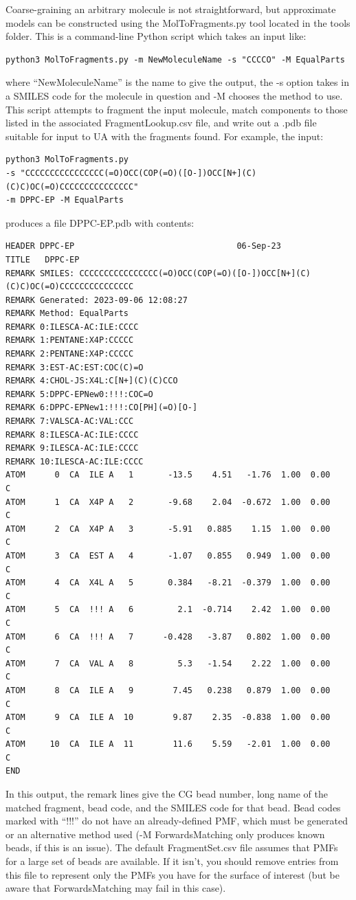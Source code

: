 \documentclass[10pt,a4paper,onecolumn]{report}
\begin{document}
Coarse-graining an arbitrary molecule is not straightforward, but approximate models can be constructed using the MolToFragments.py tool located in the tools folder. This is a command-line Python script which takes an input like:
\begin{lstlisting}
python3 MolToFragments.py -m NewMoleculeName -s "CCCCO" -M EqualParts
\end{lstlisting}
where ``NewMoleculeName'' is the name to give the output, the -s option takes in a SMILES code for the molecule in question and -M chooses the method to use. This script attempts to fragment the input molecule, match components to those listed in the associated FragmentLookup.csv file, and write out a .pdb file suitable for input to UA with the fragments found. For example, the input:
\begin{lstlisting}
python3 MolToFragments.py 
-s "CCCCCCCCCCCCCCCC(=O)OCC(COP(=O)([O-])OCC[N+](C)(C)C)OC(=O)CCCCCCCCCCCCCCC" 
-m DPPC-EP -M EqualParts
\end{lstlisting}
produces a file DPPC-EP.pdb with contents:
\begin{lstlisting}
HEADER DPPC-EP                                 06-Sep-23
TITLE   DPPC-EP
REMARK SMILES: CCCCCCCCCCCCCCCC(=O)OCC(COP(=O)([O-])OCC[N+](C)(C)C)OC(=O)CCCCCCCCCCCCCCC
REMARK Generated: 2023-09-06 12:08:27
REMARK Method: EqualParts
REMARK 0:ILESCA-AC:ILE:CCCC
REMARK 1:PENTANE:X4P:CCCCC
REMARK 2:PENTANE:X4P:CCCCC
REMARK 3:EST-AC:EST:COC(C)=O
REMARK 4:CHOL-JS:X4L:C[N+](C)(C)CCO
REMARK 5:DPPC-EPNew0:!!!:COC=O
REMARK 6:DPPC-EPNew1:!!!:CO[PH](=O)[O-]
REMARK 7:VALSCA-AC:VAL:CCC
REMARK 8:ILESCA-AC:ILE:CCCC
REMARK 9:ILESCA-AC:ILE:CCCC
REMARK 10:ILESCA-AC:ILE:CCCC
ATOM      0  CA  ILE A   1       -13.5    4.51   -1.76  1.00  0.00           C
ATOM      1  CA  X4P A   2       -9.68    2.04  -0.672  1.00  0.00           C
ATOM      2  CA  X4P A   3       -5.91   0.885    1.15  1.00  0.00           C
ATOM      3  CA  EST A   4       -1.07   0.855   0.949  1.00  0.00           C
ATOM      4  CA  X4L A   5       0.384   -8.21  -0.379  1.00  0.00           C
ATOM      5  CA  !!! A   6         2.1  -0.714    2.42  1.00  0.00           C
ATOM      6  CA  !!! A   7      -0.428   -3.87   0.802  1.00  0.00           C
ATOM      7  CA  VAL A   8         5.3   -1.54    2.22  1.00  0.00           C
ATOM      8  CA  ILE A   9        7.45   0.238   0.879  1.00  0.00           C
ATOM      9  CA  ILE A  10        9.87    2.35  -0.838  1.00  0.00           C
ATOM     10  CA  ILE A  11        11.6    5.59   -2.01  1.00  0.00           C
END
\end{lstlisting}
In this output, the remark lines give the CG bead number, long name of the matched fragment, bead code, and the SMILES code for that bead. Bead codes marked with ``!!!'' do not have an already-defined PMF, which must be generated or an alternative method used (-M ForwardsMatching only produces known beads, if this is an issue). The default FragmentSet.csv file assumes that PMFs for a large set of beads are available. If it isn't, you should remove entries from this file to represent only the PMFs you have for the surface of interest (but be aware that ForwardsMatching may fail in this case).
\end{document}
